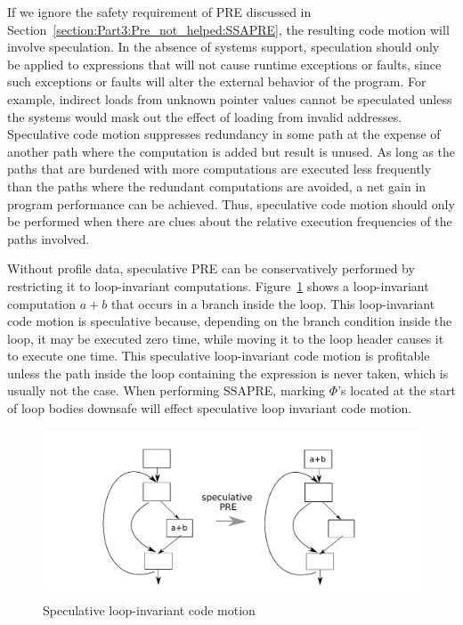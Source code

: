 If we ignore the safety requirement of PRE discussed in 
Section~\ref{section:Part3:Pre_not_helped:SSAPRE}, the resulting code motion
will involve speculation.
In the absence of systems support, speculation should only be applied to
expressions that will not cause runtime exceptions or faults, since such
exceptions or faults will alter the external behavior of the program.  
For example, indirect loads from unknown pointer values cannot be speculated
unless the systems would mask out the effect of loading from invalid addresses.
Speculative code motion suppresses
redundancy in some path at the expense of another path where the computation 
is added but result is unused.  As long as the paths that are burdened with
more computations are executed less frequently than the paths where the
redundant computations are avoided, a net gain in program performance can be
achieved.  Thus, speculative code motion should only be performed when there
are clues about the relative execution frequencies of the paths involved.

Without profile data, speculative PRE can be conservatively performed by
restricting it to loop-invariant computations.  
Figure~\ref{fig: spec-pre} shows
a loop-invariant computation $a+b$ that occurs in a branch inside the loop.
This loop-invariant code motion is speculative because, depending on the
branch condition inside the loop, it may be executed zero time, while moving it
to the loop header causes it to execute one time. This speculative 
loop-invariant code motion is profitable unless the path inside the loop
containing the expression is never taken, which is usually not the case.
When performing SSAPRE, marking $\Phi$'s located at the start of loop bodies
downsafe will effect speculative loop invariant code motion\cite{Lo98}. 

\begin{figure}
\centering
\includegraphics[scale=0.55]{fig-spec-pre.pdf}
\caption{Speculative loop-invariant code motion}
\label{fig: spec-pre}
\end{figure}

